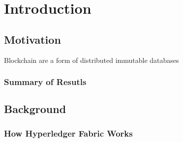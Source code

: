 \chapter{Introduction}

\section{Motivation}

Blockchain are a form of distributed immutable databases

\subsection{Summary of Resutls}


\section{Background}


\subsection{How Hyperledger Fabric Works}
\cite[prefix][postfix]{kuzluPerformanceAnalysisHyperledger2019}
